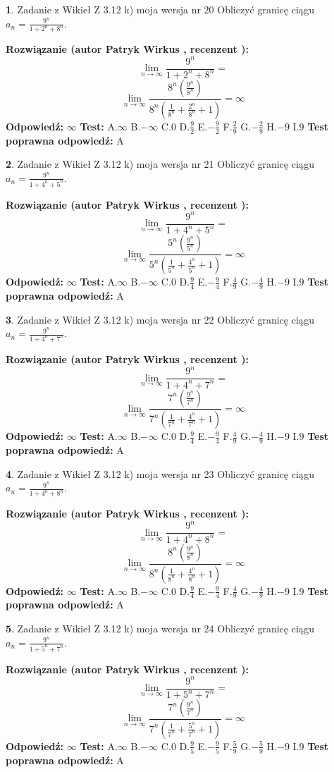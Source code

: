 \documentclass[12pt, a4paper]{article}
\theoremstyle{definition} %
\newtheorem{zad}{}
\newcommand{\zadStart}[1]{\begin{zad}#1\newline}
\newcommand{\zadStop}{\end{zad}}
\newcommand{\rozwStart}[2]{\noindent \textbf{Rozwiązanie (autor #1 , recenzent #2): }\newline}
\newcommand{\rozwStop}{\newline}
\newcommand{\odpStart}{\noindent \textbf{Odpowiedź:}\newline}
\newcommand{\odpStop}{\newline}
\newcommand{\testStart}{\noindent \textbf{Test:}\newline}
\newcommand{\testStop}{\newline}
\newcommand{\kluczStart}{\noindent \textbf{Test poprawna odpowiedź:}\newline}
\newcommand{\kluczStop}{\newline}
\begin{document}
\zadStart{Zadanie z Wikieł Z 3.12 k) moja wersja nr 20}
Obliczyć granicę ciągu $a_{n}=\frac{9^{n}}{1+2^{n} + 8^{n}}$.
\zadStop
\rozwStart{Patryk Wirkus}{}
$$\lim\limits_{n\to\infty}\frac{9^{n}}{1+2^{n} + 8^{n}}=$$
$$\lim\limits_{n\to\infty}\frac{8^{n}(\frac{9^{n}}{8^{n}} )}{8^{n}(\frac{1}{8^{n}}+\frac{2^{n}}{8^{n}}+1)} = \infty$$
\rozwStop
\odpStart
$\infty$
\odpStop
\testStart
A.$\infty$
B.$-\infty$
C.$0$
D.$\frac{9}{2}$
E.$-\frac{9}{2}$
F.$\frac{2}{9}$
G.$-\frac{2}{9}$
H.$-9$
I.$9$
\testStop
\kluczStart
A
\kluczStop



\zadStart{Zadanie z Wikieł Z 3.12 k) moja wersja nr 21}
Obliczyć granicę ciągu $a_{n}=\frac{9^{n}}{1+4^{n} + 5^{n}}$.
\zadStop
\rozwStart{Patryk Wirkus}{}
$$\lim\limits_{n\to\infty}\frac{9^{n}}{1+4^{n} + 5^{n}}=$$
$$\lim\limits_{n\to\infty}\frac{5^{n}(\frac{9^{n}}{5^{n}} )}{5^{n}(\frac{1}{5^{n}}+\frac{4^{n}}{5^{n}}+1)} = \infty$$
\rozwStop
\odpStart
$\infty$
\odpStop
\testStart
A.$\infty$
B.$-\infty$
C.$0$
D.$\frac{9}{4}$
E.$-\frac{9}{4}$
F.$\frac{4}{9}$
G.$-\frac{4}{9}$
H.$-9$
I.$9$
\testStop
\kluczStart
A
\kluczStop



\zadStart{Zadanie z Wikieł Z 3.12 k) moja wersja nr 22}
Obliczyć granicę ciągu $a_{n}=\frac{9^{n}}{1+4^{n} + 7^{n}}$.
\zadStop
\rozwStart{Patryk Wirkus}{}
$$\lim\limits_{n\to\infty}\frac{9^{n}}{1+4^{n} + 7^{n}}=$$
$$\lim\limits_{n\to\infty}\frac{7^{n}(\frac{9^{n}}{7^{n}} )}{7^{n}(\frac{1}{7^{n}}+\frac{4^{n}}{7^{n}}+1)} = \infty$$
\rozwStop
\odpStart
$\infty$
\odpStop
\testStart
A.$\infty$
B.$-\infty$
C.$0$
D.$\frac{9}{4}$
E.$-\frac{9}{4}$
F.$\frac{4}{9}$
G.$-\frac{4}{9}$
H.$-9$
I.$9$
\testStop
\kluczStart
A
\kluczStop



\zadStart{Zadanie z Wikieł Z 3.12 k) moja wersja nr 23}
Obliczyć granicę ciągu $a_{n}=\frac{9^{n}}{1+4^{n} + 8^{n}}$.
\zadStop
\rozwStart{Patryk Wirkus}{}
$$\lim\limits_{n\to\infty}\frac{9^{n}}{1+4^{n} + 8^{n}}=$$
$$\lim\limits_{n\to\infty}\frac{8^{n}(\frac{9^{n}}{8^{n}} )}{8^{n}(\frac{1}{8^{n}}+\frac{4^{n}}{8^{n}}+1)} = \infty$$
\rozwStop
\odpStart
$\infty$
\odpStop
\testStart
A.$\infty$
B.$-\infty$
C.$0$
D.$\frac{9}{4}$
E.$-\frac{9}{4}$
F.$\frac{4}{9}$
G.$-\frac{4}{9}$
H.$-9$
I.$9$
\testStop
\kluczStart
A
\kluczStop



\zadStart{Zadanie z Wikieł Z 3.12 k) moja wersja nr 24}
Obliczyć granicę ciągu $a_{n}=\frac{9^{n}}{1+5^{n} + 7^{n}}$.
\zadStop
\rozwStart{Patryk Wirkus}{}
$$\lim\limits_{n\to\infty}\frac{9^{n}}{1+5^{n} + 7^{n}}=$$
$$\lim\limits_{n\to\infty}\frac{7^{n}(\frac{9^{n}}{7^{n}} )}{7^{n}(\frac{1}{7^{n}}+\frac{5^{n}}{7^{n}}+1)} = \infty$$
\rozwStop
\odpStart
$\infty$
\odpStop
\testStart
A.$\infty$
B.$-\infty$
C.$0$
D.$\frac{9}{5}$
E.$-\frac{9}{5}$
F.$\frac{5}{9}$
G.$-\frac{5}{9}$
H.$-9$
I.$9$
\testStop
\kluczStart
A
\kluczStop
\end{document}

